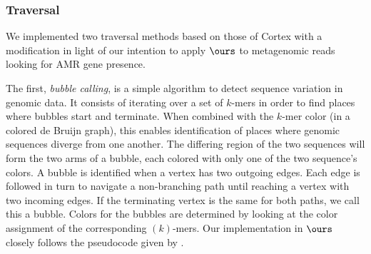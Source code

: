%
%

\subsubsection{Traversal}
We implemented two traversal methods based on those of {\sc Cortex} with a modification in light of our intention to apply $\ours$ to metagenomic reads looking for AMR gene presence.

The first, {\it bubble calling}, is a simple algorithm to detect sequence variation in genomic data. It consists of iterating over a set of $k$-mers in order to find places where bubbles start and terminate.  When combined with the $k$-mer color (in a colored de Bruijn graph), this enables identification of places where genomic sequences diverge from one another.  The differing region of the two sequences will form the two arms of a bubble, each colored with only one of the two sequence's colors.  A bubble is identified when a vertex has two outgoing edges. Each edge is followed in turn to navigate a non-branching path until reaching a vertex with two incoming edges. If the terminating vertex is the same for both paths, we call this a bubble. Colors for the bubbles are determined by looking at the color assignment of the corresponding $(k)$-mers. Our implementation in $\ours$ closely follows the pseudocode given by \cite{ICTFM12}.



